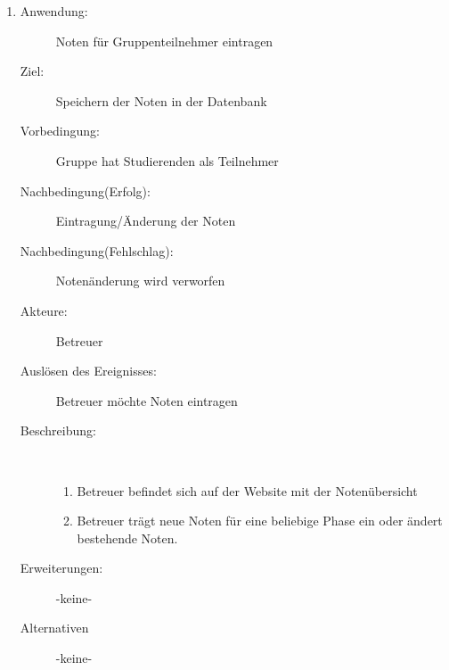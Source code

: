 \documentclass[parskip=full]{scrartcl}
\newcommand{\swtLabel}[1]{\textbf{/#1\arabic*0/}}
\begin{document}
\begin{enumerate} [label=\swtLabel{B}]
  
  \item
    \begin{description}
  	\item[Anwendung:] Noten für Gruppenteilnehmer eintragen
  	\item[Ziel:] Speichern der Noten in der Datenbank
  	\item[Vorbedingung:] Gruppe hat Studierenden als Teilnehmer
  	\item[Nachbedingung(Erfolg):] Eintragung/Änderung der Noten
  	\item[Nachbedingung(Fehlschlag):] Notenänderung wird verworfen
  	\item[Akteure:] Betreuer
  	\item[Auslösen des Ereignisses:] Betreuer möchte Noten eintragen
  	\item[Beschreibung:]~
  	\begin{enumerate} 
  	  \item Betreuer befindet sich auf der Website mit der Notenübersicht
  	  \item Betreuer trägt neue Noten für eine beliebige Phase ein oder ändert bestehende Noten.
  	\end{enumerate}
  	\item[Erweiterungen:] -keine-
  	\item[Alternativen] -keine-
  \end{description}
   
\end{enumerate}
\end{document}
